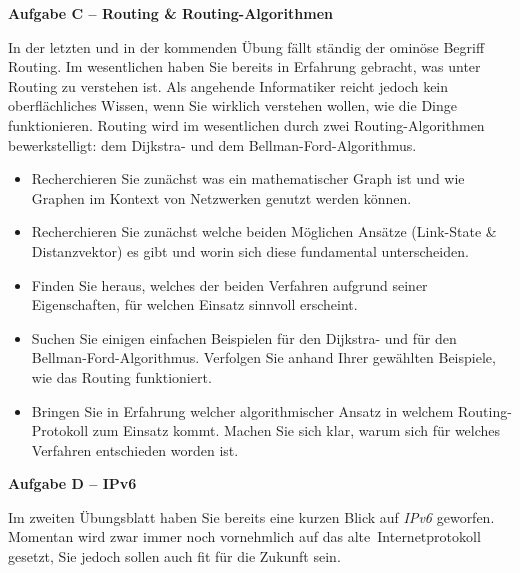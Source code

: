 \documentclass[paper=a4,fontsize=11pt]{scrartcl}%
\numberwithin{equation}{section}
\begin{document}
\begin{center}\Large{\textbf{Aufgabe C -- Routing \& Routing-Algorithmen}}\end{center}\vskip0.25in
In der letzten und in der kommenden Übung fällt ständig der ominöse Begriff Routing. Im wesentlichen haben Sie bereits in Erfahrung gebracht, was unter Routing zu verstehen ist. Als angehende Informatiker reicht jedoch kein oberflächliches Wissen, wenn Sie wirklich verstehen wollen, wie die Dinge funktionieren. Routing wird im wesentlichen durch zwei Routing-Algorithmen bewerkstelligt: dem Dijkstra- und dem Bellman-Ford-Algorithmus.
\begin{itemize}
	\item Recherchieren Sie zunächst was ein mathematischer Graph ist und wie Graphen im Kontext von Netzwerken genutzt werden können.
	\item Recherchieren Sie zunächst welche beiden Möglichen Ansätze (Link-State \& Distanzvektor) es gibt und worin sich diese fundamental unterscheiden.
	\item Finden Sie heraus, welches der beiden Verfahren aufgrund seiner Eigenschaften, für welchen Einsatz sinnvoll erscheint.
	\item Suchen Sie einigen einfachen Beispielen für den Dijkstra- und für den Bellman-Ford-Algorithmus. Verfolgen Sie anhand Ihrer gewählten Beispiele, wie das Routing funktioniert.
	\item Bringen Sie in Erfahrung welcher algorithmischer Ansatz in welchem Routing-Protokoll zum Einsatz kommt. Machen Sie sich klar, warum sich für welches Verfahren entschieden worden ist.
\end{itemize}
\begin{center}\Large{\textbf{Aufgabe D -- IPv6}}\end{center}\vskip0.25in
Im zweiten Übungsblatt haben Sie bereits eine kurzen Blick auf \emph{IPv6} geworfen. Momentan wird zwar immer noch vornehmlich auf das \glqq alte\grqq\ Internetprotokoll gesetzt, Sie jedoch sollen auch fit für die Zukunft sein.
\end{document}
